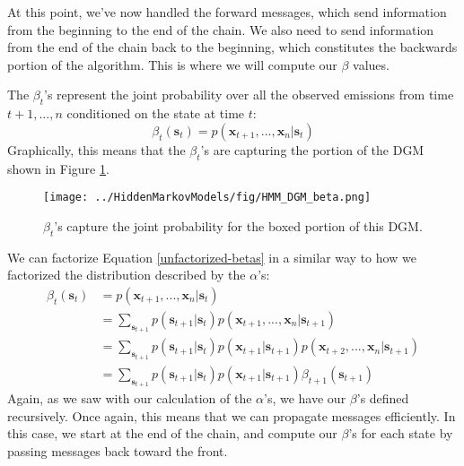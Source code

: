 At this point, we've now handled the forward messages, which send information from the beginning to the end of the chain. We also need to send information from the end of the chain back to the beginning, which constitutes the backwards portion of the algorithm. This is where we will compute our $\beta$ values.

The $\beta_t$'s represent the joint probability over all the observed emissions from time $t+1, ..., n$ conditioned on the state at time $t$:
\begin{equation} \label{unfactorized-betas}
	\beta_t(\textbf{s}_t) = p(\textbf{x}_{t+1}, ..., \textbf{x}_n | \textbf{s}_t)
\end{equation}
Graphically, this means that the $\beta_t$'s are capturing the portion of the DGM shown in Figure \ref{fig:HMM-DGM-beta}.
\begin{figure}
    \centering
    \texttt{[image: ../HiddenMarkovModels/fig/HMM\_DGM\_beta.png]}
    \caption{$\beta_t$'s capture the joint probability for the boxed portion of this DGM.}
    \label{fig:HMM-DGM-beta}
\end{figure}

We can factorize Equation \ref{unfactorized-betas} in a similar way to how we factorized the distribution described by the $\alpha$'s:
\begin{align} \label{factorized-betas}
	\beta_t(\textbf{s}_t) &= p(\textbf{x}_{t+1}, ..., \textbf{x}_n | \textbf{s}_t) \\
	&= \sum_{\textbf{s}_{t+1}} p(\textbf{s}_{t+1} | \textbf{s}_t) p(\textbf{x}_{t+1}, ..., \textbf{x}_n | \textbf{s}_{t+1}) \\
	&= \sum_{\textbf{s}_{t+1}} p(\textbf{s}_{t+1} | \textbf{s}_t) p(\textbf{x}_{t+1} | \textbf{s}_{t+1}) p(\textbf{x}_{t+2}, ..., \textbf{x}_n | \textbf{s}_{t+1}) \\
	&= \sum_{\textbf{s}_{t+1}} p(\textbf{s}_{t+1} | \textbf{s}_t) p(\textbf{x}_{t+1} | \textbf{s}_{t+1}) \beta_{t+1}(\textbf{s}_{t+1})
\end{align}
Again, as we saw with our calculation of the $\alpha$'s, we have our $\beta$'s defined recursively. Once again, this means that we can propagate messages efficiently. In this case, we start at the end of the chain, and compute our $\beta$'s for each state by passing messages back toward the front.

